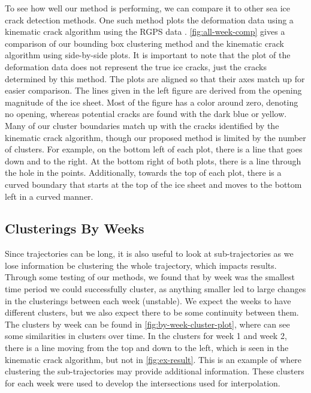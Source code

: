 \documentclass[12pt]{article}
\begin{document}
To see how well our method is performing, we can compare it to other sea
ice crack detection methods. One such method plots the deformation data
using a kinematic crack algorithm using the RGPS data
\citep{peterson_evaluating_2011}. \cref{fig:all-week-comp} gives a
comparison of our bounding box clustering method and the kinematic crack
algorithm using side-by-side plots. It is important to note that the
plot of the deformation data does not represent the true ice cracks,
just the cracks determined by this method. The plots are aligned so that
their axes match up for easier comparison. The lines given in the left
figure are derived from the opening magnitude of the ice sheet. Most of
the figure has a color around zero, denoting no opening, whereas
potential cracks are found with the dark blue or yellow. Many of our
cluster boundaries match up with the cracks identified by the kinematic
crack algorithm, though our proposed method is limited by the number of
clusters. For example, on the bottom left of each plot, there is a line
that goes down and to the right. At the bottom right of both plots,
there is a line through the hole in the points. Additionally, towards
the top of each plot, there is a curved boundary that starts at the top
of the ice sheet and moves to the bottom left in a curved manner.

\hypertarget{clusterings-by-weeks}{%
\subsection{Clusterings By Weeks}\label{clusterings-by-weeks}}

Since trajectories can be long, it is also useful to look at
sub-trajectories as we lose information be clustering the whole
trajectory, which impacts results. Through some testing of our methods,
we found that by week was the smallest time period we could successfully
cluster, as anything smaller led to large changes in the clusterings
between each week (unstable). We expect the weeks to have different
clusters, but we also expect there to be some continuity between them.
The clusters by week can be found in \cref{fig:by-week-cluster-plot},
where can see some similarities in clusters over time. In the clusters
for week 1 and week 2, there is a line moving from the top and down to
the left, which is seen in the kinematic crack algorithm, but not in
\cref{fig:ex-result}. This is an example of where clustering the
sub-trajectories may provide additional information. These clusters for
each week were used to develop the intersections used for interpolation.
\end{document}
